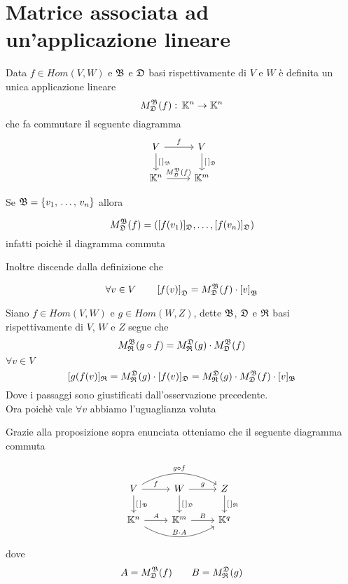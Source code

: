 \newpage
\section{Matrice associata ad un'applicazione lineare}
\begin{defn}\bianco
Data $f \in Hom(V,W)$ e $\mathfrak{B}$ e $\mathfrak{D}$ basi rispettivamente di $V$ e $W$ \`e definita un unica applicazione lineare $$ M_{\mathfrak{D}} ^{\mathfrak{B}}(f) :\, \mathbb{K}^n \to \mathbb{K}^n $$ che fa commutare il seguente diagramma
$$ \begin{tikzcd} V \arrow[r,"f"]
\arrow{d}{[\, ]_\B} & V \arrow{d}{[\,]_\D} \\ \K^n \arrow{r}{\AB(f)} & \K^m
\end{tikzcd}$$
\begin{oss}\label{mat_appl} Se $\mathfrak{B} = \{ v_1, \, \dots , \, v_n \} $ allora

$$ M_{\mathfrak{D}} ^{\mathfrak{B}} (f) = \left( [f(v_1)]_{\mathfrak{D}} , \dots , [f(v_n)]_{\mathfrak{D}}  \right) $$
infatti poich\`e il diagramma commuta 
 
Inoltre discende dalla definizione che

$$ \forall v \in V \qquad \left[ f(v) \right]_{\mathfrak{D}} = M_{\mathfrak{D}} ^{\mathfrak{B}} (f) \cdot \left[ v \right]_{\mathfrak{B}} $$
\end{oss}
\end{defn}
\spazio
\begin{prop}\label{mat_comp}\bianco
Siano $f\in Hom(V,W) $ e $g \in Hom(W,Z)$, dette $\mathfrak{B} $, $\mathfrak{D}$ e $\mathfrak{R}$  basi rispettivamente di $V$, $W$ e $Z$ segue che 
$$ M^{\mathfrak{B}}_{\mathfrak{R}} (g\circ f ) = M^{\mathfrak{D}}_{\mathfrak{R}} (g) \cdot M_{\mathfrak{D}} ^{\mathfrak{B}} (f)$$
\proof
$\forall v \in V $
$$ [ g(f(v)]_{\mathfrak{R}} = M_{\mathfrak{R}}^{\mathfrak{D}} (g) \cdot [ f(v)]_{\mathfrak{D}} = M_{\mathfrak{R}}^{\mathfrak{D}}(g) \cdot M_{\mathfrak{D}} ^{\mathfrak{B}} (f) \cdot [v]_{\mathfrak{B}} $$
Dove i passaggi sono giustificati dall'osservazione precedente.\\
Ora poich\`e vale $\forall v$ abbiamo l'uguaglianza voluta
\endproof
\begin{oss}Grazie alla proposizione sopra enunciata otteniamo che il seguente diagramma commuta

$$\begin{tikzcd} V \arrow[r,"f"] \arrow[bend left]{rr}{g\circ f} \arrow{d}{[\,]_\B } &W \arrow[r,"g"] \arrow{d}{[\, ]_\D }  & Z \arrow{d}{[\,]_\RR }\\ \K^n \arrow[r, "A" ] \arrow[bend right]{rr}{B\cdot A } & \K^m \arrow[r,"B"] & \K^q 
\end{tikzcd}$$
dove 
$$ A = M_{\mathfrak{D}} ^{\mathfrak{B}} (f) \qquad  B =M^{\mathfrak{D}}_{\mathfrak{R}} (g)$$

\end{oss}
\end{prop}
